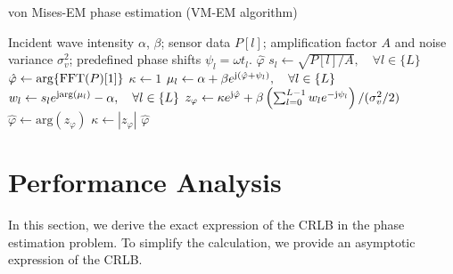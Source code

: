 \documentclass[conference,10pt,twocolumn]{IEEEtran}
\theoremstyle{nonumberplain}
\def \arg {\text{arg}}
\begin{document}
    \begin{algorithm}[htbp] 
        \caption{von Mises-EM phase estimation (VM-EM algorithm)} \label{alg:VM-EM}
        \begin{algorithmic}[1]
            \REQUIRE Incident wave intensity $\alpha$, $\beta$; sensor data $P[l]$; amplification factor $A$ and noise variance $\sigma_v^2$; predefined phase shifts $\psi_l=\omega t_l$.
            \ENSURE $\hat{\varphi}$
            \STATE $s_l \leftarrow \sqrt{P[l]/A}, \quad \forall l\in \{L\}$
            \STATE $\hat{\varphi} \leftarrow \arg\{{\rm FFT}(P)[1]\}$
            \STATE $\kappa \leftarrow 1$
                \STATE $\mu_l \leftarrow \alpha + \beta e^{{\rm j} (\hat{\varphi}+\psi_l)}, \quad \forall l\in \{L\}$
                \STATE $w_l \leftarrow s_l e^{{\rm j} \arg(\mu_l)} - \alpha, \quad \forall l\in \{L\}$
                \STATE $z_\varphi \leftarrow \kappa e^{{\rm j} \hat{\varphi}} + \beta \left( \sum_{l=0}^{L-1}{w_l e^{-{\rm j} \psi_l}}\right) / (\sigma_v^2/2)$
                \STATE $\hat{\varphi} \leftarrow \arg(z_\varphi)$
                \STATE $\kappa \leftarrow |z_\varphi|$
            \ENDWHILE
            \RETURN $\hat{\varphi}$
        \end{algorithmic}
    \end{algorithm}
    
\section{Performance Analysis}
\label{Performance Analysis}
    In this section, we derive the exact expression of the CRLB in the phase estimation problem. 
    To simplify the calculation, we provide an asymptotic expression of the CRLB.
\end{document}
